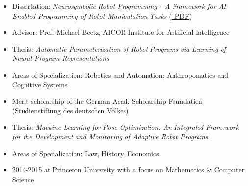 
\begin{itemize}
  \item Dissertation: \textit{Neurosymbolic Robot Programming - A Framework for AI-Enabled Programming of Robot Manipulation Tasks} (\href{https://doi.org/10.26092/elib/3727}{\faLink ~PDF})
  \item Advisor: Prof. Michael Beetz, AICOR Institute for Artificial Intelligence
\end{itemize}

\medskip

\begin{itemize}
  \item Thesis: \textit{Automatic Parameterization of Robot Programs via Learning of Neural Program Representations}
  \item Areas of Specialization: Robotics and Automation; Anthropomatics and Cognitive Systems
  \item Merit scholarship of the German Acad. Scholarship Foundation (Studienstiftung des deutschen Volkes)
\end{itemize}

\medskip

\begin{itemize}
  \item Thesis: \textit{Machine Learning for Pose Optimization: An Integrated Framework for the Development and Monitoring of Adaptive Robot Programs}
\end{itemize}

\medskip

\begin{itemize}
  \item Areas of Specialization: Law, History, Economics
  \item 2014-2015 at Princeton University with a focus on Mathematics \& Computer Science
\end{itemize}